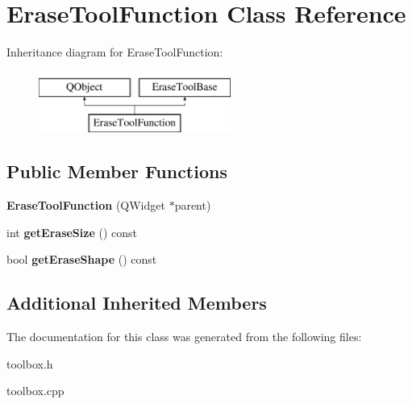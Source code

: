 \hypertarget{class_erase_tool_function}{\section{Erase\-Tool\-Function Class Reference}
\label{class_erase_tool_function}
}
Inheritance diagram for Erase\-Tool\-Function\-:\begin{figure}[H]
\begin{center}
\leavevmode
\includegraphics[height=2.000000cm]{class_erase_tool_function}
\end{center}
\end{figure}
\subsection*{Public Member Functions}
\begin{DoxyCompactItemize}
\item 
\hypertarget{class_erase_tool_function_ae8be235ad017c706c4ec7c01aa01fd0d}{{\bfseries Erase\-Tool\-Function} (Q\-Widget $\ast$parent)}\label{class_erase_tool_function_ae8be235ad017c706c4ec7c01aa01fd0d}

\item 
\hypertarget{class_erase_tool_function_acdee509cf5d65cdcf98aa0aa29ab22cc}{int {\bfseries get\-Erase\-Size} () const }\label{class_erase_tool_function_acdee509cf5d65cdcf98aa0aa29ab22cc}

\item 
\hypertarget{class_erase_tool_function_aebfa0e968e37a66f94c5843611193372}{bool {\bfseries get\-Erase\-Shape} () const }\label{class_erase_tool_function_aebfa0e968e37a66f94c5843611193372}

\end{DoxyCompactItemize}
\subsection*{Additional Inherited Members}


The documentation for this class was generated from the following files\-:\begin{DoxyCompactItemize}
\item 
toolbox.\-h\item 
toolbox.\-cpp\end{DoxyCompactItemize}
